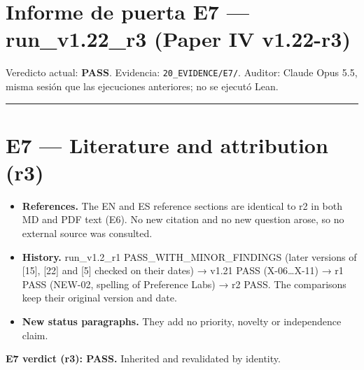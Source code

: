\documentclass[
]{article}
\author{}
\date{}
\providecommand{\tightlist}{%
  \setlength{\itemsep}{0pt}\setlength{\parskip}{0pt}}
\begin{document}
\section{Informe de puerta E7 --- run\_v1.22\_r3 (Paper IV
v1.22-r3)}\label{informe-de-puerta-e7--run_v122_r3-paper-iv-v122-r3}

Veredicto actual: \textbf{PASS}. Evidencia: \texttt{20\_EVIDENCE/E7/}.
Auditor: Claude Opus 5.5, misma sesión que las ejecuciones anteriores;
no se ejecutó Lean.

\begin{center}\rule{0.5\linewidth}{0.5pt}\end{center}

\section{E7 --- Literature and attribution
(r3)}\label{e7--literature-and-attribution-r3}

\begin{itemize}
\tightlist
\item
  \textbf{References.} The EN and ES reference sections are identical to
  r2 in both MD and PDF text (E6). No new citation and no new question
  arose, so no external source was consulted.
\item
  \textbf{History.} run\_v1.2\_r1 PASS\_WITH\_MINOR\_FINDINGS (later
  versions of {[}15{]}, {[}22{]} and {[}5{]} checked on their dates) →
  v1.21 PASS (X-06\ldots X-11) → r1 PASS (NEW-02, spelling of Preference
  Labs) → r2 PASS. The comparisons keep their original version and date.
\item
  \textbf{New status paragraphs.} They add no priority, novelty or
  independence claim.
\end{itemize}

\textbf{E7 verdict (r3): PASS.} Inherited and revalidated by identity.
\end{document}
